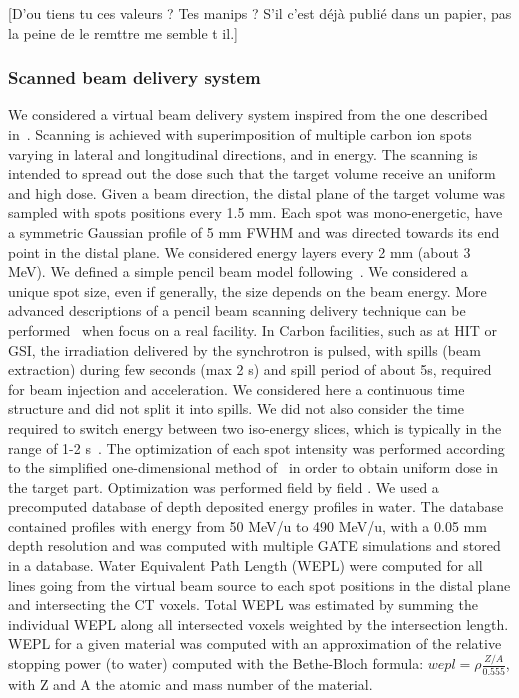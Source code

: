\documentclass[11pt]{iopart}
\newcommand{\dsnote}[1]{{\color{green}[#1]}} %
\providecommand{\DIFaddtex}[1]{{\protect\color{blue}\uwave{#1}}} %
\providecommand{\DIFaddbegin}{} %
\providecommand{\DIFaddend}{} %
\providecommand{\DIFdelbegin}{} %
\providecommand{\DIFdelend}{} %
\providecommand{\DIFadd}[1]{\texorpdfstring{\DIFaddtex{#1}}{#1}} %
\begin{document}
\DIFaddbegin \dsnote{D'ou tiens tu ces valeurs ? Tes manips ? S'il c'est déjà
  publié dans un papier, pas la peine de le remttre me semble t il.}


\DIFaddend \subsubsection{Scanned beam delivery system}

We considered a virtual beam delivery system inspired from the one
described in~\cite{Kramer2000a}. Scanning is achieved with
superimposition of multiple carbon ion spots varying in lateral and
longitudinal directions, and in energy. The scanning is intended to
spread out the dose such that the target volume receive an uniform and
high dose.  Given a beam direction, the distal plane of the target
volume was sampled with spots positions every 1.5 mm. Each spot was
mono-energetic, have a symmetric Gaussian profile of 5 mm FWHM and was
directed towards its end point in the distal plane. We considered
energy layers every 2 mm (about 3 MeV). We defined a simple pencil
beam model following~\cite{Grevillot2010}. We considered a unique spot
size, even if generally, the size depends on the beam energy. More
advanced descriptions of a pencil beam scanning delivery technique can
be performed~\DIFdelbegin %
\DIFdelend \DIFaddbegin \cite{Grevillot2011} \DIFaddend when focus on a real facility. In
Carbon facilities, such as at HIT or GSI, the irradiation delivered by
the synchrotron is pulsed, with spills (beam extraction) during few
seconds (max 2 s) and spill period of about 5s, required for beam
injection and acceleration. We considered here a continuous time
structure and did not split it into spills. We did not also consider
the time required to switch energy between two iso-energy slices,
which is typically in the range of 1-2 s~\cite{Rietzel2010}. The
optimization of each spot intensity was performed according to the
simplified one-dimensional method of~\cite{Kramer2000a} in order to
obtain uniform dose in the target part. Optimization was performed
field by field \DIFaddbegin \DIFadd{(single field uniform dose, SFUD~}\cite{Lomax1999}\DIFadd{)}\DIFaddend . We
used a precomputed database of depth deposited energy profiles in
water. The database contained profiles with energy from 50 MeV/u to
490 MeV/u, with a 0.05 mm depth resolution and was computed with
multiple GATE simulations and stored in a database. Water Equivalent
Path Length (WEPL) were computed for all lines going from the virtual
beam source to each spot positions in the distal plane and
intersecting the CT voxels. Total WEPL was estimated by summing the
individual WEPL along all intersected voxels weighted by the
intersection length. WEPL for a given material was computed with an
approximation of the relative stopping power (to water) computed with
the Bethe-Bloch formula: $wepl = \rho \frac{Z/A}{0.555}$, with Z and A
the atomic and mass number of the material.
\DIFdelbegin %
\DIFdelend \DIFaddbegin 
\end{document}
